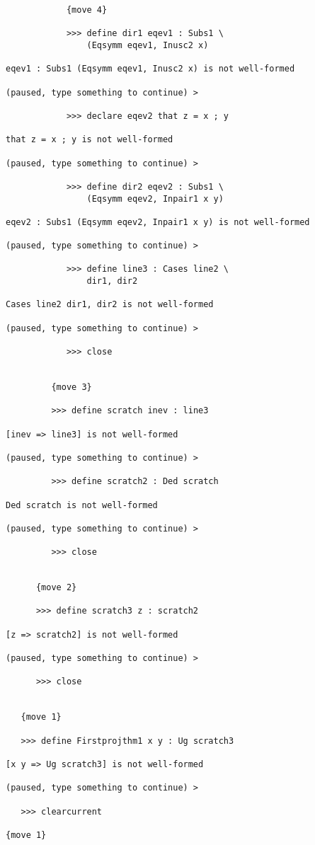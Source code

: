 \documentclass[12pt]{article}
\begin{document}
\begin{verbatim}
            {move 4}

            >>> define dir1 eqev1 : Subs1 \
                (Eqsymm eqev1, Inusc2 x)

eqev1 : Subs1 (Eqsymm eqev1, Inusc2 x) is not well-formed

(paused, type something to continue) >

            >>> declare eqev2 that z = x ; y

that z = x ; y is not well-formed

(paused, type something to continue) >

            >>> define dir2 eqev2 : Subs1 \
                (Eqsymm eqev2, Inpair1 x y)

eqev2 : Subs1 (Eqsymm eqev2, Inpair1 x y) is not well-formed

(paused, type something to continue) >

            >>> define line3 : Cases line2 \
                dir1, dir2

Cases line2 dir1, dir2 is not well-formed

(paused, type something to continue) >

            >>> close


         {move 3}

         >>> define scratch inev : line3

[inev => line3] is not well-formed

(paused, type something to continue) >

         >>> define scratch2 : Ded scratch

Ded scratch is not well-formed

(paused, type something to continue) >

         >>> close


      {move 2}

      >>> define scratch3 z : scratch2

[z => scratch2] is not well-formed

(paused, type something to continue) >

      >>> close


   {move 1}

   >>> define Firstprojthm1 x y : Ug scratch3

[x y => Ug scratch3] is not well-formed

(paused, type something to continue) >

   >>> clearcurrent

{move 1}


\end{verbatim}
\end{document}
